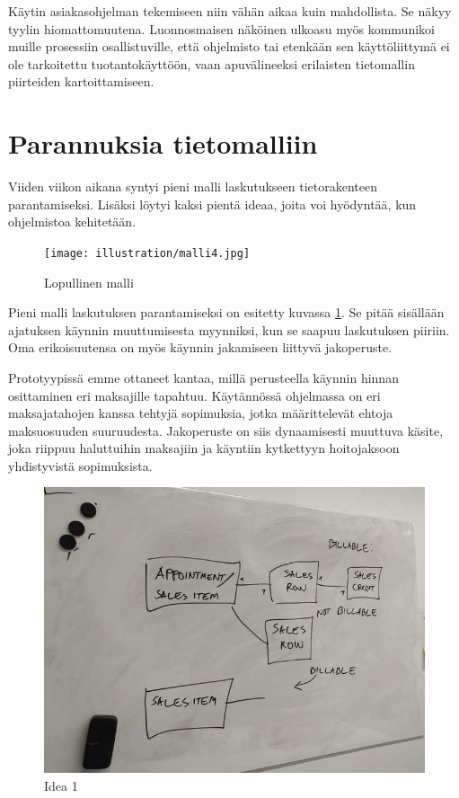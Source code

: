 Käytin asiakasohjelman tekemiseen niin vähän aikaa kuin mahdollista. Se
näkyy tyylin hiomattomuutena. Luonnosmaisen näköinen ulkoasu myös
kommunikoi muille prosessiin osallistuville, että ohjelmisto tai
etenkään sen käyttöliittymä ei ole tarkoitettu tuotantokäyttöön, vaan
apuvälineeksi erilaisten tietomallin piirteiden kartoittamiseen.

\hypertarget{parannuksia-tietomalliin}{%
\section{Parannuksia tietomalliin}\label{parannuksia-tietomalliin}}

Viiden viikon aikana syntyi pieni malli laskutukseen tietorakenteen
parantamiseksi. Lisäksi löytyi kaksi pientä ideaa, joita voi hyödyntää,
kun ohjelmistoa kehitetään.

\begin{figure}
\centering
\texttt{[image: illustration/malli4.jpg]}
\caption{\label{finalmodel1-again}Lopullinen malli}
\end{figure}

Pieni malli laskutuksen parantamiseksi on esitetty kuvassa
\ref{finalmodel1-again}. Se pitää sisällään ajatuksen käynnin
muuttumisesta myynniksi, kun se saapuu laskutuksen piiriin. Oma
erikoisuutensa on myös käynnin jakamiseen liittyvä jakoperuste.

Prototyypissä emme ottaneet kantaa, millä perusteella käynnin hinnan
osittaminen eri maksajille tapahtuu. Käytännössä ohjelmassa on eri
maksajatahojen kanssa tehtyjä sopimuksia, jotka määrittelevät ehtoja
maksuosuuden suuruudesta. Jakoperuste on siis dynaamisesti muuttuva
käsite, joka riippuu haluttuihin maksajiin ja käyntiin kytkettyyn
hoitojaksoon yhdistyvistä sopimuksista.

\begin{figure}
\centering
\includegraphics{illustration/final-idea-1.jpg}
\caption{\label{finalidea1}Idea 1}
\end{figure}


